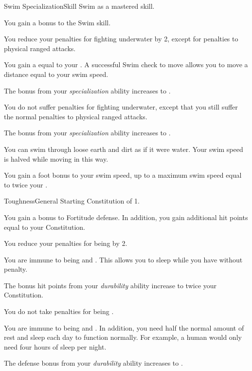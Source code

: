    \begin{feat}{Swim Specialization}{Skill}
        \featpre Swim as a mastered skill.

         You gain a  bonus to the Swim skill.

         You reduce your penalties for fighting underwater by 2, except for penalties to physical ranged attacks.

         You gain a  equal to your .
        A successful Swim check to move allows you to move a distance equal to your swim speed.

         The bonus from your \textit{specialization} ability increases to .

         You do not suffer penalties for fighting underwater, except that you still suffer the normal penalties to physical ranged attacks.

         The bonus from your \textit{specialization} ability increases to .

         You can swim through loose earth and dirt as if it were water.
        Your swim speed is halved while moving in this way.

         You gain a  foot bonus to your swim speed, up to a maximum swim speed equal to twice your .
    \end{feat}

    \begin{feat}{Toughness}{General}
        \featpre Starting Constitution of 1.

         You gain a  bonus to Fortitude defense.
        In addition, you gain additional hit points equal to your Constitution.

         You reduce your penalties for being  by 2.

         You are immune to being  and .
        This allows you to sleep while you have  without penalty.

         The bonus hit points from your \textit{durability} ability increase to twice your Constitution.

         You do not take penalties for being .

         You are immune to being  and .
        In addition, you need half the normal amount of rest and sleep each day to function normally.
        For example, a human would only need four hours of sleep per night.

         The defense bonus from your \textit{durability} ability increases to .
    \end{feat}

